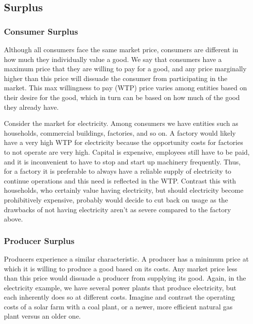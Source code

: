\documentclass[letterpaper,10pt,english]{jupyterBook}
\begin{document}
\subsection{Surplus}
\label{\detokenize{content/03-public/surplus:surplus}}\label{\detokenize{content/03-public/surplus::doc}}

\subsubsection{Consumer Surplus}
\label{\detokenize{content/03-public/surplus:consumer-surplus}}
\sphinxAtStartPar
Although all consumers face the same market price, consumers are different in how much they individually value a good. We say that consumers have a maximum price that they are willing to pay for a good, and any price marginally higher than this price will dissuade the consumer from participating in the market. This max willingness to pay (WTP) price varies among entities based on their desire for the good, which in turn can be based on how much of the good they already have.

\sphinxAtStartPar
Consider the market for electricity. Among consumers we have entities such as households, commercial buildings, factories, and so on. A factory would likely have a very high WTP for electricity because the opportunity costs for factories to not operate are very high. Capital is expensive, employees still have to be paid, and it is inconvenient to have to stop and start up machinery frequently. Thus, for a factory it is preferable to always have a reliable supply of electricity to continue operations and this need is reflected in the WTP. Contrast this with households, who certainly value having electricity, but should electricity become prohibitively expensive, probably would decide to cut back on usage as the drawbacks of not having electricity aren’t as severe compared to the factory above.


\subsubsection{Producer Surplus}
\label{\detokenize{content/03-public/surplus:producer-surplus}}
\sphinxAtStartPar
Producers experience a similar characteristic. A producer has a minimum price at which it is willing to produce a good based on its costs. Any market price less than this price would dissuade a producer from supplying its good. Again, in the electricity example, we have several power plants that produce electricity, but each inherently does so at different costs. Imagine and contrast the operating costs of a solar farm with a coal plant, or a newer, more efficient natural gas plant versus an older one.
\end{document}
